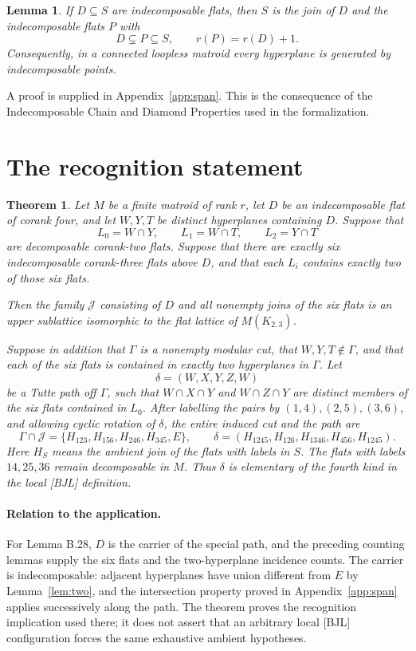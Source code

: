 \documentclass[11pt]{article}
\newtheorem{theorem}{Theorem}
\newtheorem{lemma}{Lemma}
\newcommand{\JJ}{\mathcal J}
\begin{document}
\begin{lemma}\label{lem:span}
If $D\subseteq S$ are indecomposable flats, then $S$ is the join of $D$ and the indecomposable flats $P$ with
\[
 D\subsetneq P\subseteq S,\qquad r(P)=r(D)+1.
\]
Consequently, in a connected loopless matroid every hyperplane is generated by indecomposable points.
\end{lemma}
\noindent A proof is supplied in Appendix~\ref{app:span}. This is the consequence of the Indecomposable Chain and Diamond Properties used in the formalization.

\section{The recognition statement}
\begin{theorem}\label{thm:recognition}
Let $M$ be a finite matroid of rank $r$, let $D$ be an indecomposable flat of corank four, and let $W,Y,T$ be distinct hyperplanes containing $D$. Suppose that
\[
 L_0=W\cap Y,\qquad L_1=W\cap T,\qquad L_2=Y\cap T
\]
are decomposable corank-two flats. Suppose that there are exactly six indecomposable corank-three flats above $D$, and that each $L_i$ contains exactly two of those six flats.

Then the family $\JJ$ consisting of $D$ and all nonempty joins of the six flats is an upper sublattice isomorphic to the flat lattice of $M(K_{2,3})$.

Suppose in addition that $\Gamma$ is a nonempty modular cut, that $W,Y,T\notin\Gamma$, and that each of the six flats is contained in exactly two \emph{hyperplanes} in $\Gamma$. Let
\[
 \delta=(W,X,Y,Z,W)
\]
be a Tutte path off $\Gamma$, such that $W\cap X\cap Y$ and $W\cap Z\cap Y$ are distinct members of the six flats contained in $L_0$. After labelling the pairs by $(1,4),(2,5),(3,6)$, and allowing cyclic rotation of $\delta$, the entire induced cut and the path are
\[
 \Gamma\cap\JJ=
 \{H_{123},H_{156},H_{246},H_{345},E\},
 \qquad
 \delta=(H_{1245},H_{126},H_{1346},H_{456},H_{1245}).
\]
Here $H_S$ means the ambient join of the flats with labels in $S$. The flats with labels $14,25,36$ remain decomposable in $M$. Thus $\delta$ is elementary of the fourth kind in the local [BJL] definition.
\end{theorem}

\paragraph{Relation to the application.}
For Lemma B.28, $D$ is the carrier of the special path, and the preceding counting lemmas supply the six flats and the two-hyperplane incidence counts. The carrier is indecomposable: adjacent hyperplanes have union different from $E$ by Lemma~\ref{lem:two}, and the intersection property proved in Appendix~\ref{app:span} applies successively along the path. The theorem proves the recognition implication used there; it does not assert that an arbitrary local [BJL] configuration forces the same exhaustive ambient hypotheses.
\end{document}
